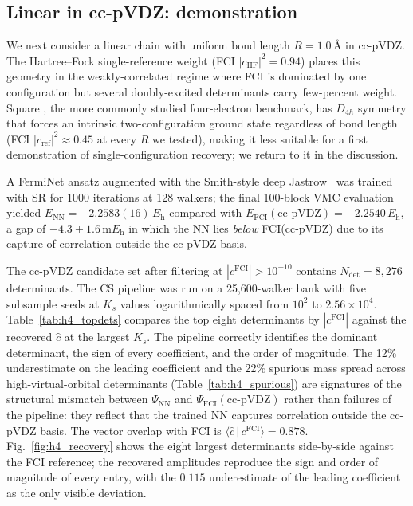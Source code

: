 \documentclass[journal=jctcce,manuscript=article,layout=traditional]{achemso}
\begin{document}
\subsection{Linear  in cc-pVDZ: demonstration}
\label{sec:h4_linear}

We next consider a linear  chain with uniform bond length
$R = 1.0\,\textrm{\AA}$ in cc-pVDZ. The Hartree--Fock single-reference
weight (FCI $|c_{\mathrm{HF}}|^2 = 0.94$) places this geometry in the
weakly-correlated regime where FCI is dominated by one configuration
but several doubly-excited determinants carry few-percent weight.
Square , the more commonly studied four-electron benchmark, has
$D_{4h}$ symmetry that forces an intrinsic two-configuration ground
state regardless of bond length (FCI $|c_{\mathrm{ref}}|^2 \approx 0.45$
at every $R$ we tested), making it less suitable for a first
demonstration of single-configuration recovery; we return to it in the
discussion.

A FermiNet ansatz augmented with the Smith-style deep
Jastrow~\cite{Hermann2020PauliNet,Pfau2020FermiNet} was trained with
SR for 1000 iterations at 128 walkers; the final 100-block VMC
evaluation yielded
$E_{\mathrm{NN}} = -2.2583(16)\,E_{\mathrm{h}}$ compared with
$E_{\mathrm{FCI}}(\text{cc-pVDZ}) = -2.2540\,E_{\mathrm{h}}$, a gap of
$-4.3 \pm 1.6\,\mathrm{m}E_{\mathrm{h}}$ in which the NN lies
\emph{below} FCI(cc-pVDZ) due to its capture of correlation outside
the cc-pVDZ basis.

The cc-pVDZ candidate set after filtering at
$|c^{\mathrm{FCI}}| > 10^{-10}$ contains
$N_{\mathrm{det}} = 8{,}276$ determinants. The CS pipeline was run on
a 25{,}600-walker bank with five subsample seeds at $K_s$ values
logarithmically spaced from $10^2$ to $2.56 \times 10^4$.
Table~\ref{tab:h4_topdets} compares the top eight determinants by
$|c^{\mathrm{FCI}}|$ against the recovered $\widehat{c}$ at the largest
$K_s$. The pipeline correctly identifies the dominant determinant, the
sign of every coefficient, and the order of magnitude. The 12\%
underestimate on the leading coefficient and the 22\% spurious mass
spread across high-virtual-orbital determinants
(Table~\ref{tab:h4_spurious}) are signatures of the structural
mismatch between $\Psi_{\mathrm{NN}}$ and
$\Psi_{\mathrm{FCI}}(\text{cc-pVDZ})$ rather than failures of the
pipeline: they reflect that the trained NN captures correlation
outside the cc-pVDZ basis. The vector overlap with FCI is
$\langle \widehat{c}\,|\,c^{\mathrm{FCI}} \rangle = 0.878$.
Fig.~\ref{fig:h4_recovery} shows the eight largest determinants
side-by-side against the FCI reference; the recovered amplitudes
reproduce the sign and order of magnitude of every entry, with the
$0.115$ underestimate of the leading coefficient as the only
visible deviation.
\end{document}
